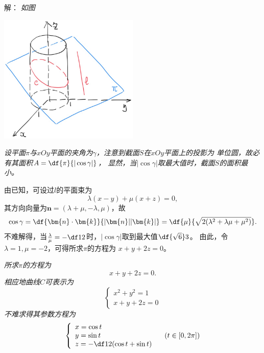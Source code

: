 \begin{frame}
	\linespread{1.5}
	
	\small 解：\it
	如图
	\begin{center}
		\includegraphics[width=0.5\textwidth]{./images/ch8/ccS.jpg}
	\end{center}
\end{frame}

\begin{frame}
	\linespread{1.5}
	
	\small \it
	设平面$\pi$与$xOy$平面的夹角为$\gamma$，注意到截面$S$在$xOy$平面上的投影为
	单位圆，故必有其面积$A=\df{\pi}{|\cos\gamma|}$，
	显然，当$|\cos\gamma|$取最大值时，截面$S$的面积最小。
	
	由已知，可设过$l$的平面束为
	$$\lambda(x-y)+\mu(x+z)=0,$$
	其方向向量为$\bm{n}=(\lambda+\mu,-\lambda,\mu)$，故
	$$\cos\gamma=\df{\bm{n}\cdot\bm{k}}{|\bm{n}||\bm{k}|}
	=\df{\mu}{\sqrt{2(\lambda^2+\lambda\mu+\mu^2)}}.$$
	不难解得，当$\frac{\lambda}{\mu}=-\df12$时，$|\cos\gamma|$取到最大值$\df{\sqrt6}3$。
	由此，令$\lambda=1,\mu=-2$，可得所求$\pi$的方程为
	$x+y+2z=0$。
\end{frame}

\begin{frame}
	\linespread{1.5}
	
	\small \it
	所求$\pi$的方程为
	$$x+y+2z=0.$$
	相应地曲线$C$可表示为
	$$\left\{\begin{array}{l}
		x^2+y^2=1\\
		x+y+2z=0
	\end{array}\right.$$
	不难求得其参数方程为
	$$\left\{\begin{array}{l}
		x=\cos t\\
		y=\sin t\\
		z=-\df12(\cos t+\sin t)
	\end{array}\right.
	\quad (t\in[0,2\pi])$$
	\fin
\end{frame}

